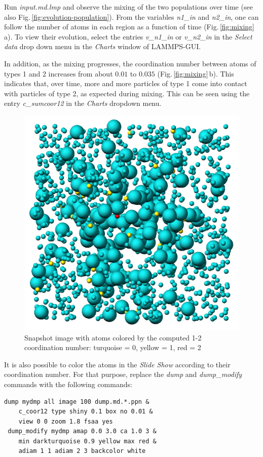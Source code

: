 \documentclass[9pt,tutorial]{livecoms}
\begin{document}
Run \textit{input.md.lmp} and observe the mixing of the two populations
over time (see also Fig.\,\ref{fig:evolution-population}).  From the
variables \textit{n1\_in} and \textit{n2\_in}, one can follow the number
of atoms in each region as a function of time
(Fig.\,\ref{fig:mixing}\,a).  To view their evolution, select the entries
\textit{v\_n1\_in} or \textit{v\_n2\_in} in the \textit{Select data} drop
down menu in the \textit{Charts} window of LAMMPS-GUI.

In addition, as the mixing progresses, the coordination number between
atoms of types 1 and 2 increases from about $0.01$ to $0.035$
(Fig.\,\ref{fig:mixing}\,b).  This indicates that, over time, more and
more particles of type 1 come into contact with particles of type 2, as
expected during mixing.  This can be seen using the entry
\textit{c\_sumcoor12} in the \textit{Charts} dropdown menu.

\begin{figure}
\centering
\includegraphics[width=0.66\linewidth]{LJ-coords}
\caption{Snapshot image with atoms colored by the computed 1-2 coordination
  number: turquoise = 0, yellow = 1, red = 2}
\label{fig:coords-viz}
\end{figure}

It is also possible to color the atoms in the \textit{Slide Show} according
to their coordination number. For that purpose, replace the \textit{dump}
and \textit{dump\_modify} commands with the following commands:
{\normalsize
\begin{verbatim}
dump mydmp all image 100 dump.md.*.ppn &
    c_coor12 type shiny 0.1 box no 0.01 &
    view 0 0 zoom 1.8 fsaa yes
 dump_modify mydmp amap 0.0 3.0 ca 1.0 3 &
    min darkturquoise 0.9 yellow max red &
    adiam 1 1 adiam 2 3 backcolor white
\end{verbatim}
}
\end{document}
